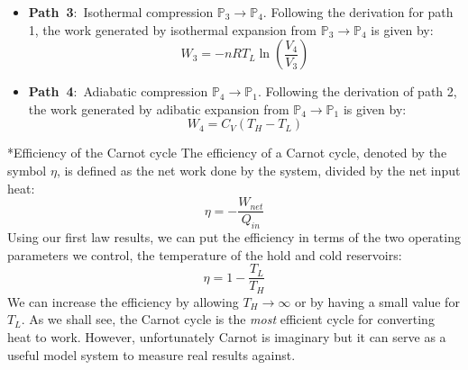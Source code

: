 \documentclass[11pt]{article}
\makeatletter
\theoremstyle{definition}
\renewcommand\subsection{\@startsection
	{subsection}{2}{0mm}
	{-0.05in}
	{0.5\baselineskip}
	{\normalfont\normalsize\bfseries}}
\makeatother
\begin{document}
\begin{itemize}
\item{\textbf{Path~3}:~Isothermal compression $\mathbb{P}_{3}\rightarrow\mathbb{P}_{4}$.
Following the derivation for path 1, the work generated by isothermal expansion from $\mathbb{P}_{3}\rightarrow\mathbb{P}_{4}$ is given by:
\begin{equation}
W_{3} = - nRT_{L}\ln\left(\frac{V_{4}}{V_{3}}\right)
\end{equation}}

\item{\textbf{Path~4}:~Adiabatic compression $\mathbb{P}_{4}\rightarrow\mathbb{P}_{1}$.
Following the derivation of path 2, the work generated by adibatic expansion from $\mathbb{P}_{4}\rightarrow\mathbb{P}_{1}$ is given by:
\begin{equation}
W_{4} = C_{V}\left(T_{H} - T_{L}\right)
\end{equation}}
\end{itemize}

\subsection*{Efficiency of the Carnot cycle}
The efficiency of a Carnot cycle, denoted by the symbol $\eta$, is defined as the net work done by the system, divided by the net input heat:
\begin{equation}
\eta = -\frac{W_{net}}{Q_{in}}
\end{equation}Using our first law results, we can put the efficiency in terms of the two operating parameters we control, the temperature of the
hold and cold reservoirs:
\begin{equation}\label{eqn:carnot-efficinecy}
\eta = 1 - \frac{T_{L}}{T_{H}}
\end{equation}We can increase the efficiency by allowing $T_{H}\rightarrow\infty$ or by having a small value for $T_{L}$.
As we shall see, the Carnot cycle is the \textit{most} efficient cycle for converting heat to work.
However, unfortunately Carnot is imaginary but it can serve as a useful model system to measure real results against.
\end{document}
